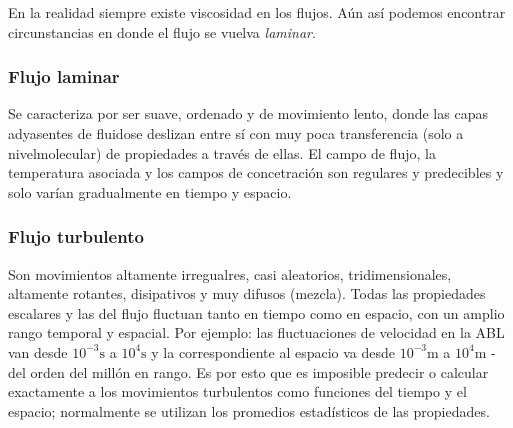\documentclass[utf-8,11pt,a4paper]{article}
\begin{document}
En la realidad siempre existe viscosidad en los flujos. Aún así podemos encontrar circunstancias en donde el flujo se vuelva \emph{laminar}.

\subsubsection{Flujo laminar}

Se caracteriza por ser suave, ordenado y de movimiento lento, donde las capas adyasentes de fluidose deslizan entre sí con muy poca transferencia (solo a nivelmolecular) de propiedades a través de ellas. El campo de flujo, la temperatura asociada y los campos de concetración son regulares y predecibles y solo varían gradualmente en tiempo y espacio.

\subsubsection{Flujo turbulento}

Son movimientos altamente irregualres, casi aleatorios, tridimensionales, altamente rotantes, disipativos y muy difusos (mezcla). Todas las propiedades escalares y las del flujo fluctuan tanto en tiempo como en espacio, con un amplio rango temporal y espacial. Por ejemplo: las fluctuaciones de velocidad en la ABL van desde $10^{-3}\mathrm{s}$ a $10^4\mathrm{s}$ y la correspondiente al espacio va desde $10^{-3}\mathrm{m}$ a $10^4\mathrm{m}$ - del orden del millón en rango. Es por esto que es imposible predecir o calcular exactamente a los movimientos turbulentos como funciones del tiempo y el espacio; normalmente se utilizan los promedios estadísticos de las propiedades.
\end{document}
